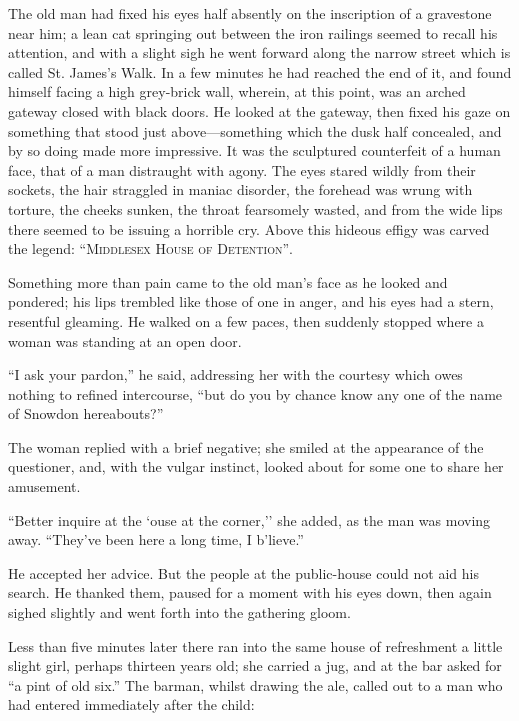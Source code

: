 The old man had fixed his eyes half absently on the inscription of a
gravestone near him; a lean cat springing out between the iron railings
seemed to recall his attention, and with a slight sigh he went forward
along the narrow street which is called St. James's Walk. In a few
minutes he had reached the end of it, and found himself facing a high
grey-brick wall, wherein, at this point, was an arched gateway closed
with black doors. He looked at the gateway, then fixed his gaze on
something that stood just above---something which the dusk half
concealed, and by so doing made more impressive. It was the sculptured
counterfeit of a human face, that of a man distraught with agony. The
eyes stared wildly from their sockets, the hair straggled in maniac
disorder, the forehead was wrung with torture, the cheeks sunken, the
throat fearsomely wasted, and from the wide lips there seemed to be
issuing a {\protect\hypertarget{5}{}{}}horrible cry. Above this hideous
effigy was carved the legend: \textsc{``Middlesex House of Detention''}.

Something more than pain came to the old man's face as he looked and
pondered; his lips trembled like those of one in anger, and his eyes had
a stern, resentful gleaming. He walked on a few paces, then suddenly
stopped where a woman was standing at an open door.

``I ask your pardon,'' he said, addressing her with the courtesy which
owes nothing to refined intercourse, ``but do you by chance know any one
of the name of Snowdon hereabouts?''

The woman replied with a brief negative; she smiled at the appearance of
the questioner, and, with the vulgar instinct, looked about for some one
to share her amusement.

``Better inquire at the `ouse at the corner,'' she added, as the man was
moving away. ``They've been here a long time, I b'lieve.''

He accepted her advice. But the people {\protect\hypertarget{6}{}{}}at
the public-house could not aid his search. He thanked them, paused for a
moment with his eyes down, then again sighed slightly and went forth
into the gathering gloom.

Less than five minutes later there ran into the same house of
refreshment a little slight girl, perhaps thirteen years old; she
carried a jug, and at the bar asked for ``a pint of old six.'' The
barman, whilst drawing the ale, called out to a man who had entered
immediately after the child:

